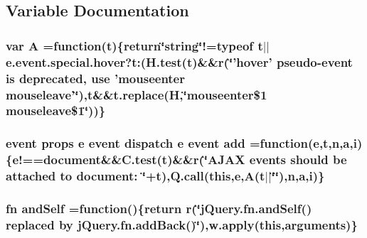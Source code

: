 \subsection{Variable Documentation}
\hypertarget{jquery-migrate-1_82_81_8min_8js_a9757042cb6157b0f84e78a5ff4aa6f93}{
\subsubsection[{A}]{\setlength{\rightskip}{0pt plus 5cm}var A =function({\bf t})\{return\char`\"{}string\char`\"{}!=typeof {\bf t}$\vert$$\vert${\bf e.\-event.\-special.\-hover}?t\-:(H.\-test({\bf t})\&\&{\bf r}(\char`\"{}'hover' pseudo-\/event is deprecated, use 'mouseenter mouseleave'\char`\"{}),t\&\&t.\-replace({\bf H},\char`\"{}mouseenter\$1 mouseleave\$1\char`\"{}))\}}}\label{jquery-migrate-1_82_81_8min_8js_a9757042cb6157b0f84e78a5ff4aa6f93}
\hypertarget{jquery-migrate-1_82_81_8min_8js_adfc2a3f1403063f39278226a02571631}{
\subsubsection[{add}]{ event props {\bf e} event dispatch {\bf e} event add =function({\bf e},{\bf t},{\bf n},{\bf a},{\bf i})\{e!=={\bf document}\&\&C.\-test({\bf t})\&\&{\bf r}(\char`\"{}A\-J\-A\-X events should be attached to document\-: \char`\"{}+t),{\bf Q.\-call}(this,{\bf e},{\bf A}({\bf t}$\vert$$\vert$\char`\"{}\char`\"{}),{\bf n},{\bf a},{\bf i})\}}}\label{jquery-migrate-1_82_81_8min_8js_adfc2a3f1403063f39278226a02571631}
\hypertarget{jquery-migrate-1_82_81_8min_8js_a87feebad0d5e7f093f60e89bd1135092}{
\subsubsection[{and\-Self}]{ {\bf fn} and\-Self =function()\{return {\bf r}(\char`\"{}j\-Query.\-fn.\-and\-Self() replaced by j\-Query.\-fn.\-add\-Back()\char`\"{}),w.\-apply(this,arguments)\}}}\label{jquery-migrate-1_82_81_8min_8js_a87feebad0d5e7f093f60e89bd1135092}
